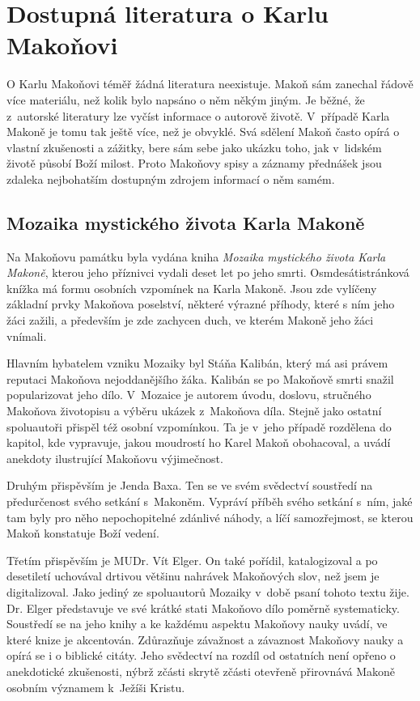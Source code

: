 \chapter{Dostupná literatura o Karlu Makoňovi}

O Karlu Makoňovi téměř žádná literatura neexistuje. Makoň sám zanechal řádově
více materiálu, než kolik bylo napsáno o něm někým jiným. Je běžné, že
z~autorské literatury lze vyčíst informace o autorově životě. V~případě Karla
Makoně je tomu tak ještě více, než je obvyklé. Svá sdělení Makoň často opírá o
vlastní zkušenosti a zážitky, bere sám sebe jako ukázku toho, jak v~lidském
životě působí Boží milost. Proto Makoňovy spisy a záznamy přednášek jsou zdaleka
nejbohatším dostupným zdrojem informací o něm samém.

\section{Mozaika mystického života Karla Makoně}

Na Makoňovu památku byla vydána
kniha \textit{Mozaika mystického života Karla Makoně},\cite{kaliban2002mozaika} kterou
jeho příznivci vydali deset let po jeho smrti.
Osmdesátistránková knížka má formu osobních vzpomínek na Karla Makoně. Jsou zde
vylíčeny základní prvky Makoňova poselství, některé výrazné příhody, které s ním
jeho žáci zažili, a především je zde zachycen duch, ve kterém Makoně jeho žáci
vnímali.

Hlavním hybatelem vzniku Mozaiky byl Stáňa Kalibán, který má asi právem reputaci
Makoňova nejoddanějšího žáka. Kalibán se po Makoňově smrti snažil popularizovat
jeho dílo. V~Mozaice je autorem úvodu, doslovu, stručného Makoňova životopisu a
výběru ukázek z~Makoňova díla. Stejně jako ostatní spoluautoři přispěl též
osobní vzpomínkou. Ta je v~jeho případě rozdělena do kapitol, kde vypravuje, jakou
moudrostí ho Karel Makoň obohacoval, a uvádí anekdoty ilustrující Makoňovu
výjimečnost.

Druhým přispěvším je Jenda Baxa. Ten se ve svém svědectví soustředí na
předurčenost svého setkání s~Makoněm. Vypráví příběh svého setkání s~ním, jaké
tam byly pro něho nepochopitelné zdánlivé náhody, a líčí samozřejmost, se kterou
Makoň konstatuje Boží vedení.

Třetím přispěvším je MUDr. Vít Elger. On také pořídil, katalogizoval a po
desetiletí uchovával drtivou většinu nahrávek Makoňových slov, než jsem je
digitalizoval. Jako jediný ze spoluautorů Mozaiky v~době psaní tohoto textu
žije. Dr. Elger představuje ve své krátké stati Makoňovo dílo poměrně
systematicky. Soustředí se na jeho knihy a ke každému aspektu Makoňovy nauky
uvádí, ve které knize je akcentován. Zdůrazňuje závažnost a závaznost Makoňovy
nauky a opírá se i o biblické citáty. Jeho svědectví na rozdíl od ostatních není
opřeno o anekdotické zkušenosti, nýbrž zčásti skrytě zčásti otevřeně přirovnává
Makoně osobním významem k~Ježíši Kristu.

